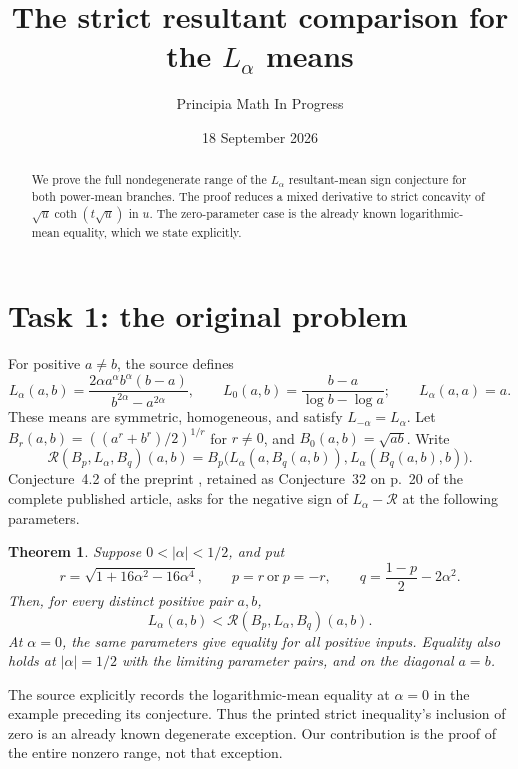 \documentclass[11pt]{article}
\title{The strict resultant comparison for the \(L_\alpha\) means}
\author{Principia Math In Progress}
\date{18 September 2026}
\newtheorem{theorem}{Theorem}
\newcommand{\R}{\mathcal R}
\begin{document}
\maketitle
\begin{abstract}
We prove the full nondegenerate range of the \(L_\alpha\)
resultant-mean sign conjecture for both power-mean branches.
The proof reduces a mixed derivative to strict concavity of
\(\sqrt u\coth(t\sqrt u)\) in \(u\). The zero-parameter case is
the already known logarithmic-mean equality, which we state explicitly.
\end{abstract}

\section*{Task 1: the original problem}
For positive \(a\ne b\), the source defines
\[
 L_\alpha(a,b)=\frac{2\alpha a^\alpha b^\alpha(b-a)}
                         {b^{2\alpha}-a^{2\alpha}},
 \qquad
 L_0(a,b)=\frac{b-a}{\log b-\log a};
 \qquad L_\alpha(a,a)=a.
\]
These means are symmetric, homogeneous, and satisfy
\(L_{-\alpha}=L_\alpha\).
Let \(B_r(a,b)=((a^r+b^r)/2)^{1/r}\) for \(r\ne0\),
and \(B_0(a,b)=\sqrt{ab}\). Write
\[
 \R(B_p,L_\alpha,B_q)(a,b)
 =B_p\bigl(L_\alpha(a,B_q(a,b)),L_\alpha(B_q(a,b),b)\bigr).
\]
Conjecture~4.2 of the preprint \cite{MR}, retained as Conjecture~32
on p.~20 of the complete published article, asks for the negative
sign of \(L_\alpha-\R\) at the following parameters.

\begin{theorem}\label{main}
Suppose \(0<|\alpha|<1/2\), and put
\[
 r=\sqrt{1+16\alpha^2-16\alpha^4},\qquad
 p=r\ \text{or}\ p=-r,\qquad
 q=\frac{1-p}{2}-2\alpha^2.
\]
Then, for every distinct positive pair \(a,b\),
\[
 L_\alpha(a,b)<\R(B_p,L_\alpha,B_q)(a,b).
\]
At \(\alpha=0\), the same parameters give equality for all positive
inputs. Equality also holds at \(|\alpha|=1/2\) with the limiting
parameter pairs, and on the diagonal \(a=b\).
\end{theorem}

The source explicitly records the logarithmic-mean equality at
\(\alpha=0\) in the example preceding its conjecture.
Thus the printed strict inequality's inclusion of zero is an
already known degenerate exception. Our contribution is the proof
of the entire nonzero range, not that exception.
\end{document}
